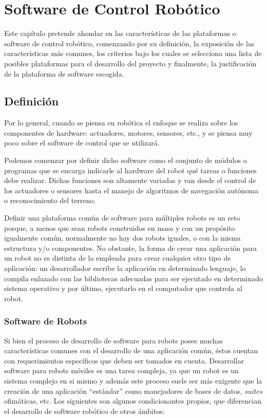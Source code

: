 \chapter{Software de Control Robótico}

Este capítulo pretende ahondar en las características de las plataformas o software de control robótico, comenzando por su definición, la exposición de las características más comunes, los criterios bajo los cuales se selecciona una lista de posibles plataformas para el desarrollo del proyecto y finalmente, la justificación de la plataforma de software escogida.

\section{Definición}

Por lo general, cuando se piensa en robótica el enfoque se realiza sobre los componentes de hardware: actuadores, motores, sensores, etc., y se piensa muy poco sobre el software de control que se utilizará.

Podemos comenzar por definir dicho software como el conjunto de módulos o programas que se encarga indicarle al hardware del robot qué tareas o funciones debe realizar. Dichas funciones son altamente variadas y van desde el control de los actuadores o sensores hasta el manejo de algoritmos de navegación autónoma o reconocimiento del terreno.

Definir una plataforma común de software para múltiples robots es un reto porque, a menos que sean robots construidos en masa y con un propósito igualmente común, normalmente no hay dos robots iguales, o con la misma estructura y/o componentes. No obstante, la forma de crear una aplicación para un robot no es distinta de la empleada para crear cualquier otro tipo de aplicación: un desarrollador escribe la aplicación en determinado lenguaje, lo compila enlazado con las bibliotecas adecuadas para ser ejecutado en determinado sistema operativo y por último, ejecutarlo en el computador que controla al robot.

\subsection{Software de Robots}

Si bien el proceso de desarrollo de software para robots posee muchas características comunes con el desarrollo de una aplicación común, éstos cuentan con requerimientos específicos que deben ser tomados en cuenta. Desarrollar software para robots móviles es una tarea compleja, ya que un robot es un sistema complejo en si mismo y además este proceso suele ser más exigente que la creación de una aplicación ``estándar'' como manejadores de bases de datos, \textit{suites} ofimáticas, etc. Los siguientes son algunos condicionantes propios, que diferencian el desarrollo de software robótico de otros ámbitos:

